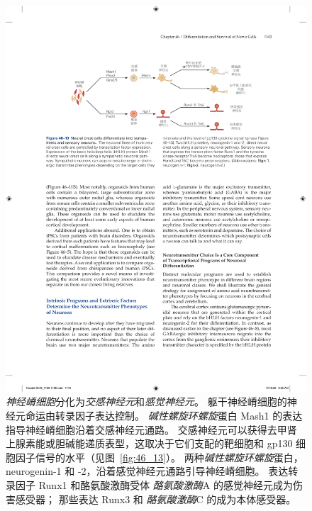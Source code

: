 \begin{figure}[htbp]
	\centering
	\includegraphics[width=1.0\linewidth]{chap46/fig_46_10}
	\caption{\textit{神经嵴细胞}分化为\textit{交感神经元}和\textit{感觉神经元}。
		躯干神经嵴细胞的神经元命运由转录因子表达控制。
		\textit{碱性螺旋环螺旋}蛋白 Mash1 的表达指导神经嵴细胞沿着交感神经元通路。
		交感神经元可以获得去甲肾上腺素能或胆碱能递质表型，这取决于它们支配的靶细胞和 gp130 细胞因子信号的水平（见图~\ref{fig:46_13}）。
		两种\textit{碱性螺旋环螺旋}蛋白，neurogenin-1 和 -2，沿着感觉神经元通路引导神经嵴细胞。
		表达转录因子 Runx1 和酪氨酸激酶受体 \textit{酪氨酸激酶}A 的感觉神经元成为伤害感受器；
		那些表达 Runx3 和 \textit{酪氨酸激酶}C 的成为本体感受器。}
	\label{fig:46_10}
\end{figure}


